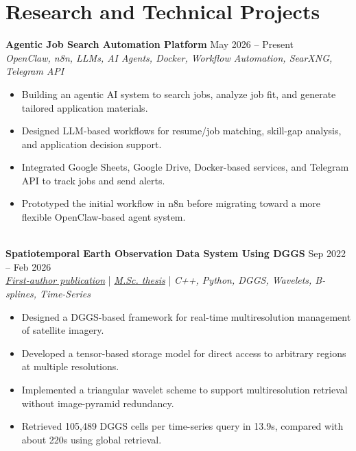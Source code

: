 \documentclass[a4paper,10pt]{article}
\begin{document}

\section*{Research and Technical Projects}

\noindent
\textbf{Agentic Job Search Automation Platform} \hfill May 2026 -- Present \\
\textit{OpenClaw, n8n, LLMs, AI Agents, Docker, Workflow Automation, SearXNG, Telegram API}
\begin{itemize}[leftmargin=0.25in]
    \item Building an agentic AI system to search jobs, analyze job fit, and generate tailored application materials.
    \item Designed LLM-based workflows for resume/job matching, skill-gap analysis, and application decision support.
    \item Integrated Google Sheets, Google Drive, Docker-based services, and Telegram API to track jobs and send alerts.
    \item Prototyped the initial workflow in n8n before migrating toward a more flexible OpenClaw-based agent system.
\end{itemize}

\noindent \\
\textbf{Spatiotemporal Earth Observation Data System Using DGGS} \hfill Sep 2022 -- Feb 2026 \\
\textit{\href{https://doi.org/10.3390/rs17040570}{First-author publication}} | \textit{\href{https://ucalgary.scholaris.ca/items/114b394b-e516-4732-bd3a-45dd6160d480}{M.Sc. thesis}} | \textit{C++, Python, DGGS, Wavelets, B-splines, Time-Series}
\begin{itemize}[leftmargin=0.25in]
    \item Designed a DGGS-based framework for real-time multiresolution management of satellite imagery.
    \item Developed a tensor-based storage model for direct access to arbitrary regions at multiple resolutions.
    \item Implemented a triangular wavelet scheme to support multiresolution retrieval without image-pyramid redundancy.
    \item Retrieved 105,489 DGGS cells per time-series query in 13.9s, compared with about 220s using global retrieval.
\end{itemize}
\end{document}
